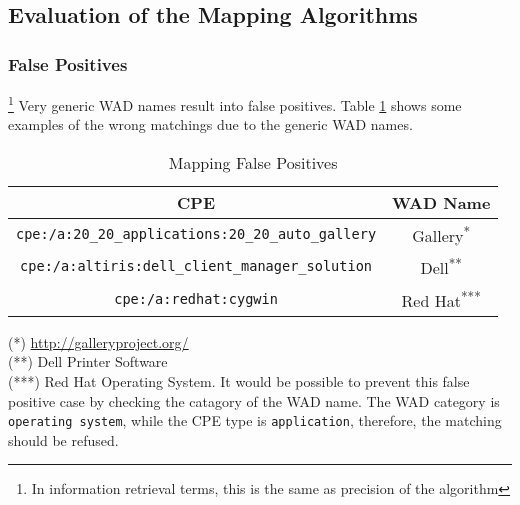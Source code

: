  
\subsection{Evaluation of the Mapping Algorithms}

\subsubsection{False Positives}\footnote{In information retrieval terms, this is the same as precision of the algorithm}
Very generic WAD names result into false positives. Table \ref{table:false_positives} shows some examples of the wrong matchings due to the generic WAD names. 
\begin{table}
\begin{center}
    \begin{tabular}{ | c | c | }
    
    \hline
	 
    CPE & WAD Name  
    \\ \hline
    \texttt{cpe:/a:20\_20\_applications:20\_20\_auto\_gallery} & Gallery\textsuperscript{*}
        \\ \hline
    \texttt{cpe:/a:altiris:dell\_client\_manager\_solution} & Dell\textsuperscript{**}
        \\ \hline
    \texttt{cpe:/a:redhat:cygwin} & Red Hat\textsuperscript{***}
        \\ \hline
    \end{tabular}
    \caption{Mapping False Positives}
    \label{table:false_positives}
   \end{center}
      \footnotesize{(*) \url{http://galleryproject.org/}\\
      (**) Dell Printer Software \\
      (***) Red Hat Operating System. It would be possible to prevent this false positive case by checking the catagory of the WAD name. The WAD category is \texttt{operating system}, while the CPE type is \texttt{application}, therefore, the matching should be refused. 
      }
\end{table}

